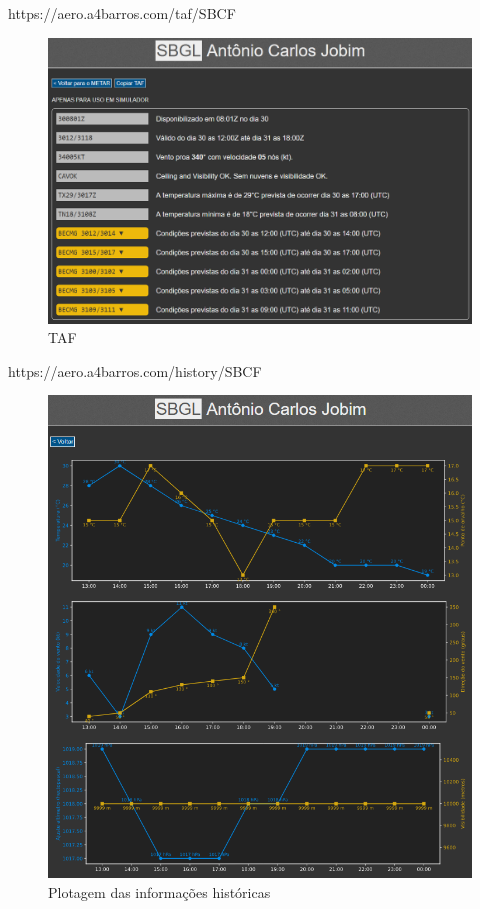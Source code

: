 https://aero.a4barros.com/taf/SBCF

\begin{figure}[H]
    \begin{center}
    \includegraphics[width=\linewidth]{img/img-taf.png}
    \caption{TAF}
    \label{fig:img-taf.png}
    \end{center}
\end{figure}

https://aero.a4barros.com/history/SBCF

\begin{figure}[H]
    \begin{center}
    \includegraphics[width=\linewidth]{img/img-history.png}
    \caption{Plotagem das informações históricas}
    \label{fig:img-history.png}
    \end{center}
\end{figure}

